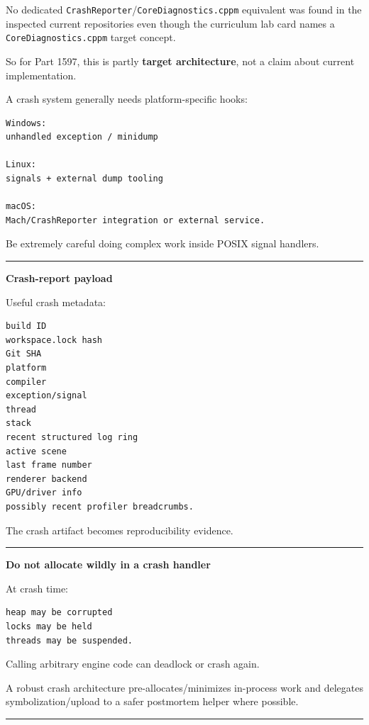 No dedicated \texttt{CrashReporter}/\texttt{CoreDiagnostics.cppm} equivalent was found in the inspected current repositories even though the curriculum lab card names a \texttt{CoreDiagnostics.cppm} target concept.

So for Part 1597, this is partly \textbf{target architecture}, not a claim about current implementation.

A crash system generally needs platform-specific hooks:

\begin{verbatim}
Windows:
unhandled exception / minidump

Linux:
signals + external dump tooling

macOS:
Mach/CrashReporter integration or external service.
\end{verbatim}

Be extremely careful doing complex work inside POSIX signal handlers.

\begin{center}\rule{0.5\linewidth}{0.5pt}\end{center}

\textbf{Crash-report payload}

Useful crash metadata:

\begin{verbatim}
build ID
workspace.lock hash
Git SHA
platform
compiler
exception/signal
thread
stack
recent structured log ring
active scene
last frame number
renderer backend
GPU/driver info
possibly recent profiler breadcrumbs.
\end{verbatim}

The crash artifact becomes reproducibility evidence.

\begin{center}\rule{0.5\linewidth}{0.5pt}\end{center}

\textbf{Do not allocate wildly in a crash handler}

At crash time:

\begin{verbatim}
heap may be corrupted
locks may be held
threads may be suspended.
\end{verbatim}

Calling arbitrary engine code can deadlock or crash again.

A robust crash architecture pre-allocates/minimizes in-process work and delegates symbolization/upload to a safer postmortem helper where possible.

\begin{center}\rule{0.5\linewidth}{0.5pt}\end{center}

